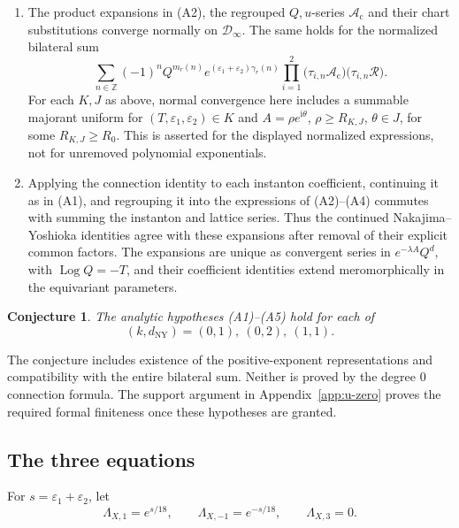 \documentclass{amsart}
\newtheorem{conjecture}{Conjecture}
\theoremstyle{definition}
\numberwithin{equation}{section}
\newcommand{\Z}{\mathbb Z}
\newcommand{\eps}{\varepsilon}
\begin{document}
\begin{enumerate}
\item[(A4)] The product expansions in (A2), the regrouped \(Q,u\)-series \(\mathscr A_{\mathrm c}\) and their chart substitutions converge normally on \(\mathscr D_\infty\).  The same holds for the normalized bilateral sum
\begin{equation}
 \sum_{n\in\Z}(-1)^n Q^{m_r(n)}
 e^{(\eps_1+\eps_2)\gamma_r(n)}
 \prod_{i=1}^2
 \bigl(\tau_{i,n}\mathscr A_{\mathrm c}\bigr)
 \bigl(\tau_{i,n}\mathcal R\bigr).
\label{eq:analytic-normalized-lattice-sum}
\end{equation}
For each \(K,J\) as above, normal convergence here includes a summable majorant uniform for \((T,\eps_1,\eps_2)\in K\) and \(A=\rho e^{\mathrm i\theta}\), \(\rho\geq R_{K,J}\), \(\theta\in J\), for some \(R_{K,J}\geq R_0\).  This is asserted for the displayed normalized expressions, not for unremoved polynomial exponentials.

\item[(A5)] Applying the connection identity to each instanton coefficient, continuing it as in (A1), and regrouping it into the expressions of (A2)--(A4) commutes with summing the instanton and lattice series.  Thus the continued Nakajima--Yoshioka identities agree with these expansions after removal of their explicit common factors.  The expansions are unique as convergent series in \(e^{-\lambda A}Q^d\), with \(\operatorname{Log}Q=-T\), and their coefficient identities extend meromorphically in the equivariant parameters.
\end{enumerate}

\begin{conjecture}
\label{conj:P2-asymptotic-resummation}
The analytic hypotheses \textup{(A1)--(A5)} hold for each of
\[
 (k,d_{\mathrm{NY}})=(0,1),\ (0,2),\ (1,1).
\]
\end{conjecture}

The conjecture includes existence of the positive-exponent representations and compatibility with the entire bilateral sum.  Neither is proved by the degree \(0\) connection formula.  The support argument in Appendix~\ref{app:u-zero} proves the required formal finiteness once these hypotheses are granted.

\subsection{The three equations}
For \(s=\eps_1+\eps_2\), let
\begin{equation}
 \Lambda_{X,1}=e^{s/18},\qquad
 \Lambda_{X,-1}=e^{-s/18},\qquad
 \Lambda_{X,3}=0.
\label{eq:X-bilinear-coefficients}
\end{equation}
\end{document}
